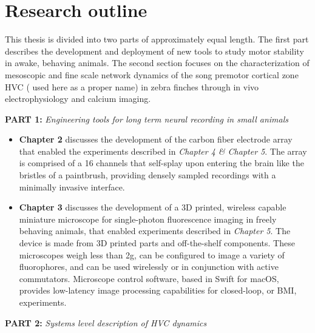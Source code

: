 \section{Research outline}

This thesis is divided into two parts of approximately equal length. The first part describes the development and deployment of new tools to study motor stability in awake, behaving animals. The second section focuses on the characterization of mesoscopic and fine scale network dynamics of the song premotor cortical zone HVC ( used here as a proper name) in zebra finches through in vivo electrophysiology and calcium imaging. 
 
\textbf{PART 1:} \textit{Engineering tools for long term neural recording in small animals }

\begin{itemize}
	\item \textbf{Chapter 2} discusses the development of the carbon fiber electrode array that enabled the experiments described in \emph{Chapter 4 \& Chapter 5}. The array is comprised of a 16 channels that self-splay upon entering the brain like the bristles of a paintbrush, providing densely sampled recordings with  a minimally invasive interface. 
		
	\item \textbf{Chapter 3} discusses the development of a 3D printed, wireless capable miniature microscope for single-photon fluorescence imaging in freely behaving animals, that enabled  experiments described in \emph{Chapter 5}. The device is made from 3D printed parts and off-the-shelf components. These microscopes weigh less than 2g, can be configured to image a variety of fluorophores, and can be used wirelessly or in conjunction with active commutators. Microscope control software, based in Swift for macOS, provides low-latency image processing capabilities for closed-loop, or BMI, experiments.
	\end{itemize}


\textbf{PART 2:} \textit{Systems level description of HVC dynamics}

